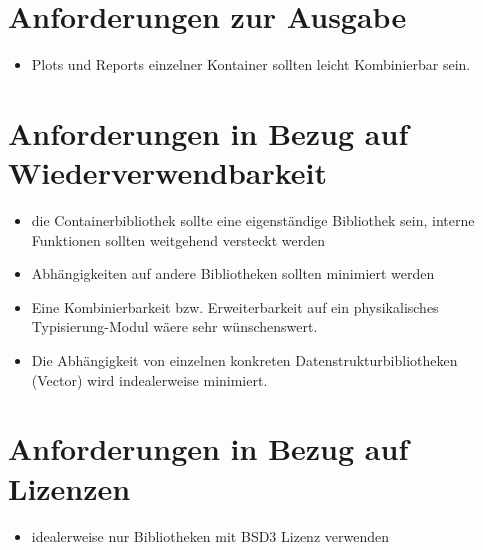 \documentclass[11pt]{article}
\begin{document}
\section{Anforderungen zur Ausgabe}
\begin{itemize}
\item Plots und Reports einzelner Kontainer sollten leicht Kombinierbar sein.
\end{itemize} 

\section{Anforderungen in Bezug auf Wiederverwendbarkeit}
\begin{itemize}
\item die Containerbibliothek sollte eine eigenst\"andige Bibliothek sein, interne Funktionen sollten weitgehend versteckt werden
\item Abh\"angigkeiten auf andere Bibliotheken sollten minimiert werden
\item Eine Kombinierbarkeit bzw. Erweiterbarkeit auf ein physikalisches Typisierung-Modul w\"aere sehr w\"unschenswert.
\item Die Abh\"angigkeit von einzelnen konkreten Datenstrukturbibliotheken (Vector) wird indealerweise minimiert.
\end{itemize} 

\section{Anforderungen in Bezug auf Lizenzen}
\begin{itemize}
\item idealerweise nur Bibliotheken mit BSD3 Lizenz verwenden
\end{itemize}
\end{document}
